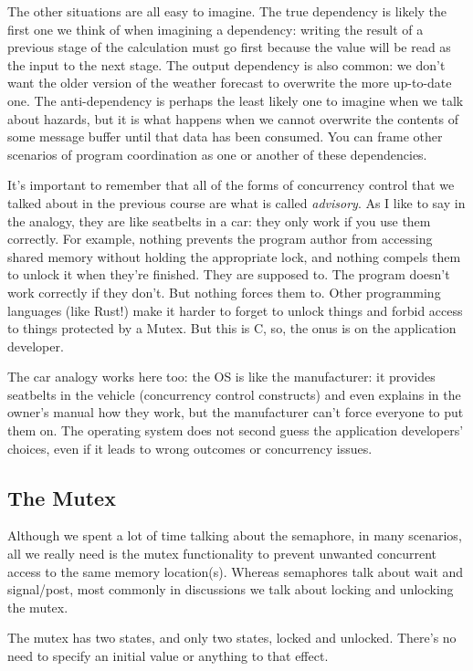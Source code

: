 The other situations are all easy to imagine. The true dependency is likely the first one we think of when imagining a dependency: writing the result of a previous stage of the calculation must go first because the value will be read as the input to the next stage. The output dependency is also common: we don't want the older version of the weather forecast to overwrite the more up-to-date one. The anti-dependency is perhaps the least likely one to imagine when we talk about hazards, but it is what happens when we cannot overwrite the contents of some message buffer until that data has been consumed. You can frame other scenarios of program coordination as one or another of these dependencies.

It's important to remember that all of the forms of concurrency control that we talked about in the previous course are what is called \textit{advisory}. As I like to say in the analogy, they are like seatbelts in a car: they only work if you use them correctly. For example, nothing prevents the program author from accessing shared memory without holding the appropriate lock, and nothing compels them to unlock it when they're finished. They are supposed to. The program doesn't work correctly if they don't. But nothing forces them to. Other programming languages (like Rust!) make it harder to forget to unlock things and forbid access to things protected by a Mutex. But this is C, so, the onus is on the application developer. 

The car analogy works here too: the OS is like the manufacturer: it provides seatbelts in the vehicle (concurrency control constructs) and even explains in the owner's manual how they work, but the manufacturer can't force everyone to put them on. The operating system does not second guess the application developers' choices, even if it leads to wrong outcomes or concurrency issues. 

\subsection*{The Mutex}

Although we spent a lot of time talking about the semaphore, in many scenarios, all we really need is the mutex functionality to prevent unwanted concurrent access to the same memory location(s). Whereas semaphores talk about wait and signal/post, most commonly in discussions we talk about locking and unlocking the mutex. 

The mutex has two states, and only two states, locked and unlocked. There's no need to specify an initial value or anything to that effect.

